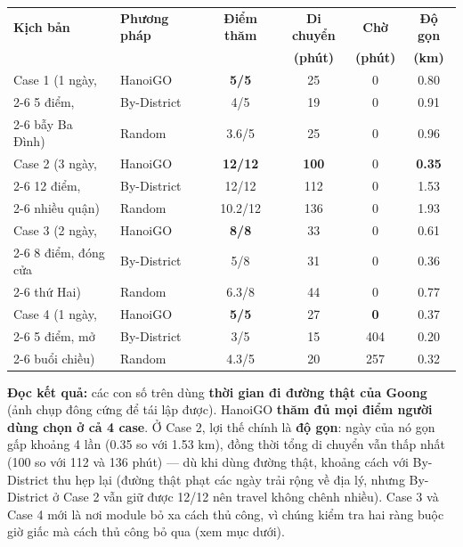 \documentclass[12pt,a4paper]{article}
\begin{document}
\begin{center}
\renewcommand{\arraystretch}{1.2}
\begin{tabular}{|l|l|c|c|c|c|}
\hline
\textbf{Kịch bản} & \textbf{Phương pháp} & \textbf{Điểm thăm} & \textbf{Di chuyển} & \textbf{Chờ} & \textbf{Độ gọn} \\
 & & & \textbf{(phút)} & \textbf{(phút)} & \textbf{(km)} \\ \hline
Case 1 (1 ngày,    & HanoiGO     & \textbf{5/5}   & 25  & 0   & 0.80 \\ \cline{2-6}
5 điểm,            & By-District & 4/5            & 19  & 0   & 0.91 \\ \cline{2-6}
bẫy Ba Đình)       & Random      & 3.6/5          & 25  & 0   & 0.96 \\ \hline
Case 2 (3 ngày,    & HanoiGO     & \textbf{12/12} & \textbf{100} & 0 & \textbf{0.35} \\ \cline{2-6}
12 điểm,           & By-District & 12/12          & 112 & 0   & 1.53 \\ \cline{2-6}
nhiều quận)        & Random      & 10.2/12        & 136 & 0   & 1.93 \\ \hline
Case 3 (2 ngày,    & HanoiGO     & \textbf{8/8}   & 33  & 0   & 0.61 \\ \cline{2-6}
8 điểm, đóng cửa   & By-District & 5/8            & 31  & 0   & 0.36 \\ \cline{2-6}
thứ Hai)           & Random      & 6.3/8          & 44  & 0   & 0.77 \\ \hline
Case 4 (1 ngày,    & HanoiGO     & \textbf{5/5}   & 27  & \textbf{0}   & 0.37 \\ \cline{2-6}
5 điểm, mở         & By-District & 3/5            & 15  & 404 & 0.20 \\ \cline{2-6}
buổi chiều)        & Random      & 4.3/5          & 20  & 257 & 0.32 \\ \hline
\end{tabular}
\end{center}

\textbf{Đọc kết quả:} các con số trên dùng \textbf{thời gian đi đường thật của
Goong} (ảnh chụp đông cứng để tái lập được). HanoiGO \textbf{thăm đủ mọi điểm
người dùng chọn ở cả 4 case}. Ở Case 2, lợi thế chính là \textbf{độ gọn}: ngày
của nó gọn gấp khoảng 4 lần (0.35 so với 1.53 km), đồng thời tổng di chuyển vẫn
thấp nhất (100 so với 112 và 136 phút) --- dù khi dùng đường thật, khoảng cách
với By-District thu hẹp lại (đường thật phạt các ngày trải rộng về địa lý, nhưng
By-District ở Case 2 vẫn giữ được 12/12 nên travel không chênh nhiều). Case 3 và
Case 4 mới là nơi module bỏ xa cách thủ công, vì chúng kiểm tra hai ràng buộc
giờ giấc mà cách thủ công bỏ qua (xem mục dưới).
\end{document}
